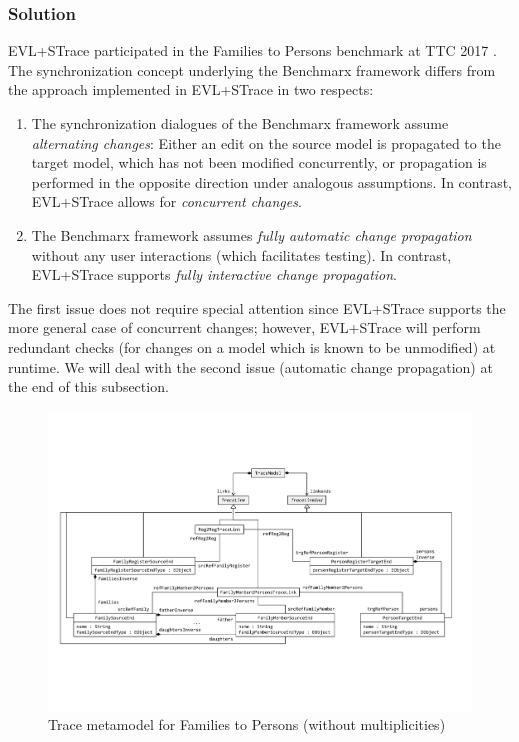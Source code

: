 \subsubsection{Solution}
\label{sec:solutionEVL}

EVL+STrace participated in the Families to Persons benchmark at TTC 2017 \cite{Samimi-Dehkordi2017}. The synchronization concept underlying the Benchmarx framework differs from the approach implemented in EVL+STrace in two respects:

\begin{enumerate}
	\item The synchronization dialogues of the Benchmarx framework assume \emph{alternating changes}: Either an edit on the source model is propagated to the target model, which has not been modified concurrently, or propagation is performed in the opposite direction under analogous assumptions. In contrast, EVL+STrace allows for \emph{concurrent changes}.
	\item The Benchmarx framework assumes \emph{fully automatic change propagation} without any user interactions (which facilitates testing). In contrast, EVL+STrace supports \emph{fully interactive change propagation}.
\end{enumerate}

The first issue does not require special attention since EVL+STrace supports the more general case of concurrent changes; however, EVL+STrace will perform redundant checks (for changes on a model which is known to be unmodified) at runtime. We will deal with the second issue (automatic change propagation) at the end of this subsection. 

\begin{figure}[tb!]
	\centering
	\includegraphics[width=\textwidth]{diagrams/solutions/EVLPlusSTraceMetamodel}
	\caption{Trace metamodel for Families to Persons (without multiplicities)}
	\label{fig:evltracemetamodel}
\end{figure}

